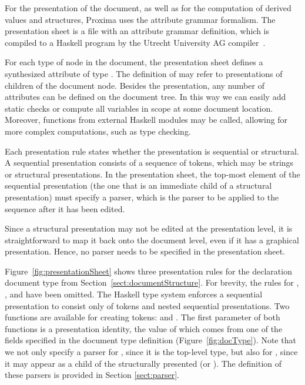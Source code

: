 \documentclass{article}[10pt]
\begin{document}
For the presentation of the document, as well as for the computation of derived values and structures, Proxima uses the attribute grammar formalism. The presentation sheet is a file with an attribute grammar definition, which is compiled to a Haskell program by the Utrecht University AG compiler~\cite{swierstra08ag}.

For each type of node in the document, the presentation sheet defines a synthesized attribute  of type . The definition of  may refer to presentations of children of the document node. Besides the presentation, any number of attributes can be defined on the document tree. In this way we can easily add static checks or compute all variables in scope at some document location. Moreover, functions from external Haskell modules may be called, allowing for more complex computations, such as type checking.


Each presentation rule states whether the presentation is sequential or structural. A sequential presentation consists of a sequence of tokens, which may be strings or structural presentations. In the presentation sheet, the top-most element of the sequential presentation (the one that is an immediate child of a structural presentation) must specify a parser, which is the parser to be applied to the sequence after it has been edited.

Since a structural presentation may not be edited at the presentation level, it is straightforward to map it back onto the document level, even if it has a graphical presentation. Hence, no parser needs to be specified in the presentation sheet.

Figure~\ref{fig:presentationSheet} shows three presentation rules for the declaration document type from Section~\ref{sect:documentStructure}. For brevity, the rules for , , and  have been omitted. The Haskell type system enforces a sequential presentation to consist only of tokens and nested sequential presentations. Two functions are available for creating tokens:  and . The first parameter of both functions is a presentation identity, the value of which comes from one of the  fields specified in the document type definition (Figure~\ref{fig:docType}). Note that we not only specify a parser for , since it is the top-level type, but also for , since it may appear as a child of the structurally presented  (or ). The definition of these parsers is provided in Section \ref{sect:parser}.
\end{document}
